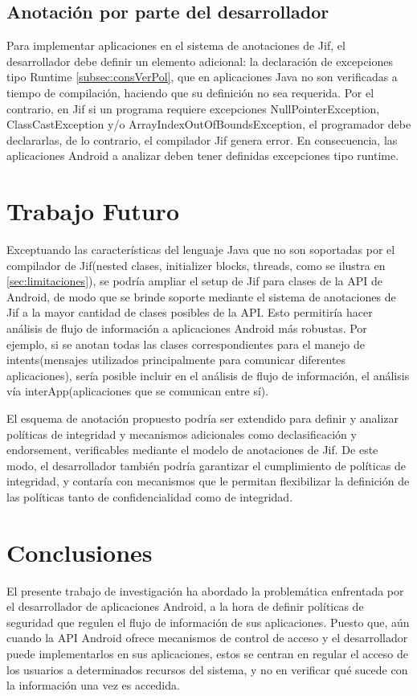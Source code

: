 \subsection{Anotación por parte del desarrollador}
\label{subsec:cambios}
Para implementar aplicaciones en el sistema de anotaciones de Jif, el
desarrollador debe definir un elemento adicional: la declaración de
excepciones tipo Runtime \ref{subsec:consVerPol}, que en aplicaciones Java no
son verificadas a tiempo de compilación, haciendo que su definición no sea requerida. 
Por el contrario, en Jif si un programa requiere excepciones
NullPointerException, ClassCastException y/o ArrayIndexOutOfBoundsException, el
programador debe declararlas, de lo contrario, el compilador Jif genera
error.
En consecuencia, las aplicaciones Android a analizar deben tener definidas
excepciones tipo runtime.

\section{Trabajo Futuro}

Exceptuando las características del lenguaje Java que no son soportadas por el
compilador de Jif(nested clases, initializer blocks, threads, como se ilustra en
 \ref{sec:limitaciones}), se podría ampliar el setup de Jif para clases de la
 API de Android, de modo que se brinde soporte mediante el sistema de anotaciones de
Jif a la mayor cantidad de clases posibles de la API.
Esto permitiría hacer análisis de flujo de información a aplicaciones
Android más robustas. Por ejemplo, si se anotan todas las clases
correspondientes para el manejo de intents(mensajes utilizados principalmente
para comunicar diferentes aplicaciones), sería posible incluir en el análisis de
flujo de información, el análisis vía interApp(aplicaciones que se comunican
entre sí). 

El esquema de anotación propuesto podría ser
extendido para definir y analizar políticas de integridad y mecanismos adicionales como declasificación y
endorsement, verificables mediante el modelo de anotaciones de Jif. De este modo,
el desarrollador también podría garantizar el cumplimiento de políticas de
integridad, y contaría con mecanismos que le permitan flexibilizar la definición
de las políticas tanto de confidencialidad como de integridad.

\section{Conclusiones}
El presente trabajo de investigación ha abordado la problemática enfrentada por
el desarrollador de aplicaciones Android, a la hora de definir políticas de
seguridad que regulen el flujo de información de sus aplicaciones. Puesto que,
aún cuando la API Android ofrece mecanismos de control de acceso y el
desarrollador puede implementarlos en sus aplicaciones, estos se centran en
regular el acceso de los usuarios a determinados recursos del sistema, y no en
verificar qué sucede con la información una vez es accedida.

